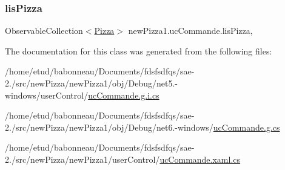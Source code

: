 \subsubsection{\texorpdfstring{lis\+Pizza}{lisPizza}}
{\footnotesize\ttfamily Observable\+Collection$<$\hyperlink{classModele_1_1Pizza}{Pizza}$>$ new\+Pizza1.\+uc\+Commande.\+lis\+Pizza\hspace{0.3cm}{\ttfamily [get]}, {\ttfamily [set]}}



The documentation for this class was generated from the following files\+:\begin{DoxyCompactItemize}
\item 
/home/etud/babonneau/\+Documents/fdsfsdfqs/sae-\/2./src/new\+Pizza/new\+Pizza1/obj/\+Debug/net5.-\/windows/user\+Control/\hyperlink{net5_80-windows_2userControl_2ucCommande_8g_8i_8cs}{uc\+Commande.\+g.\+i.\+cs}\item 
/home/etud/babonneau/\+Documents/fdsfsdfqs/sae-\/2./src/new\+Pizza/new\+Pizza1/obj/\+Debug/net6.-\/windows/\hyperlink{Debug_2net6_80-windows_2ucCommande_8g_8cs}{uc\+Commande.\+g.\+cs}\item 
/home/etud/babonneau/\+Documents/fdsfsdfqs/sae-\/2./src/new\+Pizza/new\+Pizza1/user\+Control/\hyperlink{ucCommande_8xaml_8cs}{uc\+Commande.\+xaml.\+cs}\end{DoxyCompactItemize}
